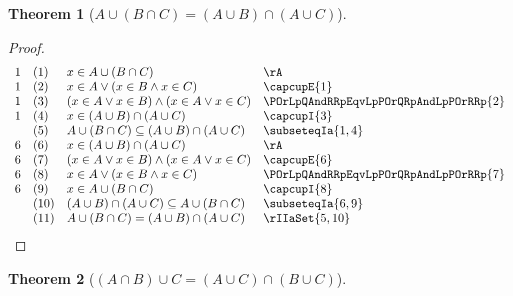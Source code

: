 \documentclass{book}
\theoremstyle{plain}
\newtheorem{theorem}{Theorem}
\theoremstyle{remark}
\theoremstyle{definition}
\begin{document}
\label{AcuLpBcaCRpEqualsLpAcuBRpcaLpAcuCRp}
\begin{theorem}[\(A \cup (B \cap C) = (A \cup B) \cap (A \cup C)\)]
\end{theorem}
\begin{proof}
	\[
	\begin{array}{llll}
		1 & (1) & x \in A \cup (B \cap C) & \rA \\
		1 & (2) & x \in A\lor (x \in B\land x\in C) & \capcupE{1} \\
		1 & (3) & (x \in A\lor x \in B)\land (x\in A\lor x\in C) & \POrLpQAndRRpEqvLpPOrQRpAndLpPOrRRp{2} \\
		1 & (4) & x\in (A\cup B)\cap (A\cup C) & \capcupI{3} \\		
		& (5) & A \cup (B \cap C)\subseteq (A\cup B)\cap (A\cup C) & \subseteqIa{1,4} \\	
		6 & (6) & x\in (A\cup B)\cap (A\cup C) & \rA \\	
		6 & (7) & (x \in A\lor x \in B)\land (x\in A\lor x\in C) & \capcupE{6} \\	
		6 & (8) & x \in A\lor (x \in B\land x\in C) & \POrLpQAndRRpEqvLpPOrQRpAndLpPOrRRp{7} \\
		6 & (9) & x \in A \cup (B \cap C) & \capcupI{8} \\
		& (10) & (A\cup B)\cap (A\cup C)\subseteq A \cup (B \cap C) & \subseteqIa{6,9} \\
		& (11) & A \cup (B \cap C) = (A\cup B)\cap (A\cup C) & \rIIaSet{5,10} \\
	\end{array}
	\]
\end{proof}

\label{LpAcaBRpcuCEqualsLpAcuCRpcaLpBcuCRp}
\begin{theorem}[\((A \cap B)\cup C = (A \cup C) \cap (B \cup C)\)]
\end{theorem}
\end{document}
